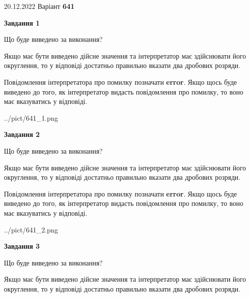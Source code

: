 \documentclass[12pt, ukrainian]{article}
\begin{document}
{20.12.2022 Варіант \No \textbf { 641 }\par}
{
\begin {Large}

{\begin {center}\textbf{Завдання 1}\end {center}}\par
Що буде виведено за виконання? \par

Якщо має бути виведено дійсне значення та інтерпретатор має здійснювати його округлення, 
то у відповіді достатньо правильно вказати два дробових розряди.

Повідомлення інтерпретатора про помилку позначати \textbf{error}.
Якщо щось буде виведено до того, як інтерпретатор видасть повідомлення про помилку, 
то воно має вказуватись у відповіді. \par

\begin{center}
	{../pict/641_1.png}
\end{center}
\newpage

{\begin {center}\textbf{Завдання 2}\end {center}}\par
Що буде виведено за виконання? \par

Якщо має бути виведено дійсне значення та інтерпретатор має здійснювати його округлення, 
то у відповіді достатньо правильно вказати два дробових розряди.

Повідомлення інтерпретатора про помилку позначати \textbf{error}.
Якщо щось буде виведено до того, як інтерпретатор видасть повідомлення про помилку, 
то воно має вказуватись у відповіді. \par

\begin{center}
	{../pict/641_2.png}
\end{center}
\newpage

{\begin {center}\textbf{Завдання 3}\end {center}}\par
Що буде виведено за виконання? \par

Якщо має бути виведено дійсне значення та інтерпретатор має здійснювати його округлення, 
то у відповіді достатньо правильно вказати два дробових розряди.


\end{Large}}
\end{document}
